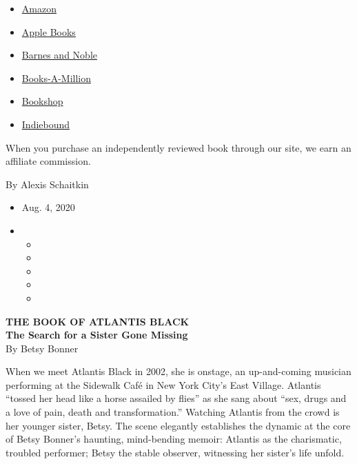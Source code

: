 \begin{itemize}
\tightlist
\item
  \href{https://www.amazon.com/gp/search?index=books\&tag=NYTBSREV-20\&field-keywords=The+Book+of+Atlantis+Black+Betsy+Bonner}{Amazon}
\item
  \href{https://du-gae-books-dot-nyt-du-prd.appspot.com/buy?title=The+Book+of+Atlantis+Black\&author=Betsy+Bonner}{Apple
  Books}
\item
  \href{https://www.anrdoezrs.net/click-7990613-11819508?url=https\%3A\%2F\%2Fwww.barnesandnoble.com\%2Fw\%2F\%3Fean\%3D9781947793774}{Barnes
  and Noble}
\item
  \href{https://www.anrdoezrs.net/click-7990613-35140?url=https\%3A\%2F\%2Fwww.booksamillion.com\%2Fp\%2FThe\%2BBook\%2Bof\%2BAtlantis\%2BBlack\%2FBetsy\%2BBonner\%2F9781947793774}{Books-A-Million}
\item
  \href{https://bookshop.org/a/3546/9781947793774}{Bookshop}
\item
  \href{https://www.indiebound.org/book/9781947793774?aff=NYT}{Indiebound}
\end{itemize}

When you purchase an independently reviewed book through our site, we
earn an affiliate commission.

By Alexis Schaitkin

\begin{itemize}
\item
  Aug. 4, 2020
\item
  \begin{itemize}
  \item
  \item
  \item
  \item
  \item
  \end{itemize}
\end{itemize}

\textbf{THE BOOK OF ATLANTIS BLACK}\\
\textbf{The Search for a Sister Gone Missing}\\
By Betsy Bonner

When we meet Atlantis Black in 2002, she is onstage, an up-and-coming
musician performing at the Sidewalk Café in New York City's East
Village. Atlantis ``tossed her head like a horse assailed by flies'' as
she sang about ``sex, drugs and a love of pain, death and
transformation.'' Watching Atlantis from the crowd is her younger
sister, Betsy. The scene elegantly establishes the dynamic at the core
of Betsy Bonner's haunting, mind-bending memoir: Atlantis as the
charismatic, troubled performer; Betsy the stable observer, witnessing
her sister's life unfold.

